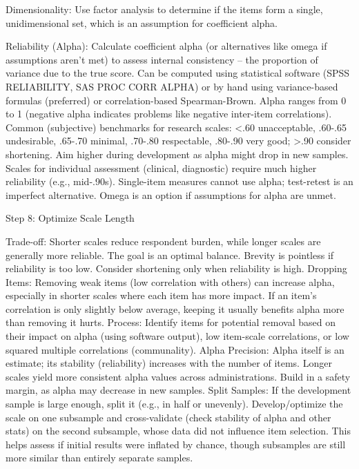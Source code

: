 \documentclass[
]{article}
\begin{document}
Dimensionality: Use factor analysis to determine if the items form a
single, unidimensional set, which is an assumption for coefficient
alpha.

Reliability (Alpha): Calculate coefficient alpha (or alternatives like
omega if assumptions aren't met) to assess internal consistency -- the
proportion of variance due to the true score. Can be computed using
statistical software (SPSS RELIABILITY, SAS PROC CORR ALPHA) or by hand
using variance-based formulas (preferred) or correlation-based
Spearman-Brown. Alpha ranges from 0 to 1 (negative alpha indicates
problems like negative inter-item correlations). Common (subjective)
benchmarks for research scales: \textless.60 unacceptable, .60-.65
undesirable, .65-.70 minimal, .70-.80 respectable, .80-.90 very good;
\textgreater.90 consider shortening. Aim higher during development as
alpha might drop in new samples. Scales for individual assessment
(clinical, diagnostic) require much higher reliability (e.g., mid-.90s).
Single-item measures cannot use alpha; test-retest is an imperfect
alternative. Omega is an option if assumptions for alpha are unmet.

Step 8: Optimize Scale Length

Trade-off: Shorter scales reduce respondent burden, while longer scales
are generally more reliable. The goal is an optimal balance. Brevity is
pointless if reliability is too low. Consider shortening only when
reliability is high. Dropping Items: Removing weak items (low
correlation with others) can increase alpha, especially in shorter
scales where each item has more impact. If an item's correlation is only
slightly below average, keeping it usually benefits alpha more than
removing it hurts. Process: Identify items for potential removal based
on their impact on alpha (using software output), low item-scale
correlations, or low squared multiple correlations (communality). Alpha
Precision: Alpha itself is an estimate; its stability (reliability)
increases with the number of items. Longer scales yield more consistent
alpha values across administrations. Build in a safety margin, as alpha
may decrease in new samples. Split Samples: If the development sample is
large enough, split it (e.g., in half or unevenly). Develop/optimize the
scale on one subsample and cross-validate (check stability of alpha and
other stats) on the second subsample, whose data did not influence item
selection. This helps assess if initial results were inflated by chance,
though subsamples are still more similar than entirely separate samples.
\end{document}
